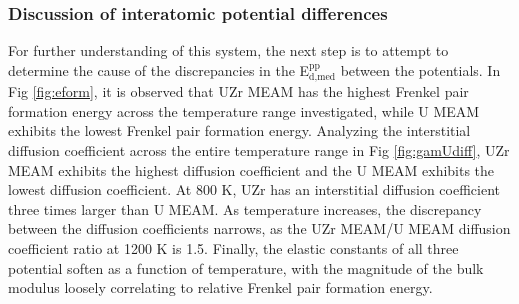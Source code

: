\documentclass[review]{elsarticle}
\begin{document}

\subsubsection{Discussion of interatomic potential differences}

For further understanding of this system, the next step is to attempt to determine the cause of the discrepancies in the E$^{\textrm{pp}}_{\textrm{d,med}}$ between the potentials. In Fig \ref{fig:eform}, it is observed that UZr MEAM has the highest Frenkel pair formation energy across the temperature range investigated, while U MEAM exhibits the lowest Frenkel pair formation energy. Analyzing the interstitial diffusion coefficient across the entire temperature range in Fig \ref{fig:gamUdiff}, UZr MEAM exhibits the highest diffusion coefficient and the U MEAM exhibits the lowest diffusion coefficient. At 800 K, UZr has an interstitial diffusion coefficient three times larger than U MEAM. As temperature increases, the discrepancy between the diffusion coefficients narrows, as the UZr MEAM/U MEAM diffusion coefficient ratio at 1200 K is 1.5.  Finally, the elastic constants of all three potential soften as a function of temperature, with the magnitude of the bulk modulus loosely correlating to relative Frenkel pair formation energy.  
\end{document}
